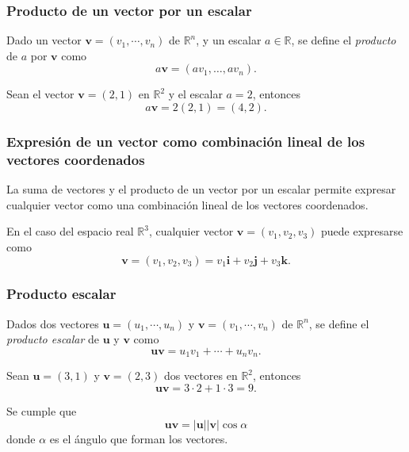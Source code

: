\begin{frame}
\frametitle{Producto de un vector por un escalar}
\begin{definicion}
Dado un vector $\mathbf{v}=(v_1,\cdots,v_n)$ de $\mathbb{R}^n$, y un escalar $a\in \mathbb{R}$, se define el
\emph{producto} de $a$ por $\mathbf{v}$ como
\[
a\mathbf{v} = (av_1,\ldots, av_n).
\]
\end{definicion}
Sean el vector $\mathbf{v}=(2,1)$ en $\mathbb{R}^2$ y el escalar $a=2$, entonces
\[
a\mathbf{v} = 2(2,1) = (4,2).
\]

\begin{center}
\scalebox{0.8}{}
\end{center}
\end{frame}  


\begin{frame}
\frametitle{Expresión de un vector como combinación lineal de los vectores coordenados}
La suma de vectores y el producto de un vector por un escalar permite expresar cualquier vector como una combinación lineal de los vectores coordenados.

En el caso del espacio real $\mathbb{R}^3$, cualquier vector $\mathbf{v}=(v_1,v_2,v_3)$ puede expresarse como   
\[
\mathbf{v}=(v_1,v_2,v_3) = v_1\mathbf{i}+v_2\mathbf{j}+v_3\mathbf{k}.
\]

\begin{center}
\scalebox{0.8}{}
\end{center}
\end{frame} 


\begin{frame}
\frametitle{Producto escalar}
\begin{definicion}
Dados dos vectores $\mathbf{u}=(u_1,\cdots,u_n)$ y $\mathbf{v}=(v_1,\cdots,v_n)$ de $\mathbb{R}^n$, se define el
\emph{producto escalar} de $\mathbf{u}$ y $\mathbf{v}$ como
\[
\mathbf{u}\mathbf{v} = u_1v_1 + \cdots + u_nv_n.
\]
\end{definicion}
Sean $\mathbf{u}=(3,1)$ y $\mathbf{v}=(2,3)$ dos vectores en $\mathbb{R}^2$, entonces
\[
\mathbf{u}\mathbf{v} = 3\cdot 2 +1\cdot 3 = 9.
\]

Se cumple que
\[
\mathbf{u}\mathbf{v} =  |\mathbf{u}||\mathbf{v}|\cos\alpha
\]
donde $\alpha$ es el ángulo que forman los vectores.
\end{frame} 


